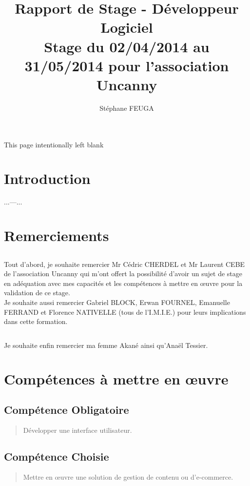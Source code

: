 \documentclass[11pt,a4paper]{report}
\author{Stéphane FEUGA}
\title{{\huge Rapport de Stage - Développeur Logiciel} \\
{\normalsize Stage du 02/04/2014 au 31/05/2014 pour l'association Uncanny}}
\begin{document}
\maketitle

\begin{center}
This page intentionally left blank
\thispagestyle{empty}
\end{center}

\tableofcontents

\chapter{Introduction}
	...---...
	
\chapter{Remerciements}
	\section*{}
		Tout d'abord, je souhaite  remercier Mr Cédric CHERDEL et Mr Laurent CEBE de l'association Uncanny qui m'ont offert la possibilité d'avoir un sujet de stage en adéquation avec mes capacités et les compétences à mettre en œuvre pour la validation de ce stage. \\
		Je souhaite aussi remercier Gabriel BLOCK, Erwan FOURNEL, Emanuelle FERRAND et Florence NATIVELLE (tous de l'I.M.I.E.) pour leurs implications dans cette formation.
	\section*{}
		Je souhaite enfin remercier ma femme Akané ainsi qu'Anaël Tessier.

\chapter{Compétences à mettre en œuvre}
	\section*{Compétence Obligatoire}
		\begin{quote}
		Développer une interface utilisateur.
		\end{quote}
	\section*{Compétence Choisie}
		\begin{quote}
		Mettre en œuvre une solution de gestion de contenu ou
		d’e-commerce.
		\end{quote}
\end{document}
